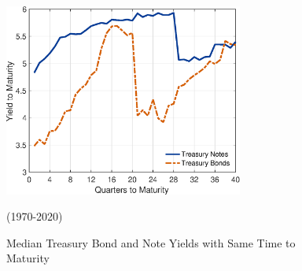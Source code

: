 \documentclass[11pt,a4paper,margin=1.5in]{article}
\begin{document}

\begin{figure}[h]
\centering
\includegraphics[width=0.7\textwidth]{../Figures/BondNote_Spread.eps}
\caption{Median Treasury Bond and Note Yields with Same Time to Maturity}{(1970-2020)}
\label{fig:YTM_Spread}
\end{figure}
\end{document}
